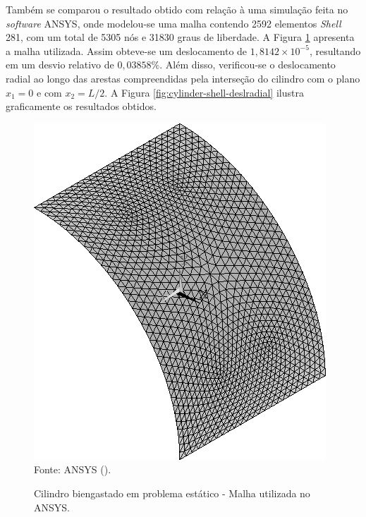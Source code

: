Também se comparou o resultado obtido com relação à uma simulação feita no \textit{software} ANSYS, onde modelou-se uma malha contendo 2592 elementos \textit{Shell} 281, com um total de 5305 nós e 31830 graus de liberdade. A Figura \ref{fig:clampedCylinderANSYS} apresenta a malha utilizada. Assim obteve-se um deslocamento de $1,8142\times10^{-5}$, resultando em um desvio relativo de $0,03858\%$. Além disso, verificou-se o deslocamento radial ao longo das arestas compreendidas pela interseção do cilindro com o plano $x_1=0$ e com $x_2=L/2$. A Figura \ref{fig:cylinder-shell-deslradial} ilustra graficamente os resultados obtidos.

\begin{figure}[h!]
    \centering
    \caption{Cilindro biengastado em problema estático - Malha utilizada no ANSYS.}
    \includegraphics[width=0.35\linewidth]{Figuras/cylinder-shell/ANSYS.png}
    \\Fonte: ANSYS (\the\year).
    \label{fig:clampedCylinderANSYS}
\end{figure}


